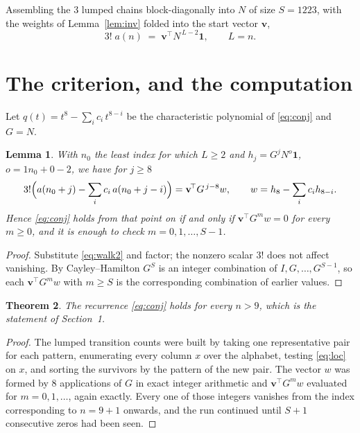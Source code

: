 \documentclass[11pt,a4paper]{article}
\theoremstyle{plain}
\newtheorem{theorem}{Theorem}
\newtheorem{lemma}[theorem]{Lemma}
\theoremstyle{definition}
\begin{document}
Assembling the $3$ lumped chains block-diagonally into $N$ of size $S=1223$, with the
weights of Lemma~\ref{lem:inv} folded into the start vector $\mathbf{v}$,
\begin{equation}\label{eq:walk2}
3!\;a(n)\;=\;\mathbf{v}^{\!\top}N^{\,L-2}\mathbf{1},\qquad L=n .
\end{equation}

\section{The criterion, and the computation}

Let $q(t)=t^{8}-\sum_i c_i\,t^{8-i}$ be the characteristic polynomial of
\eqref{eq:conj} and $G=N$.

\begin{lemma}\label{lem:crit}
With $n_0$ the least index for which $L\ge2$ and $h_j=G^{j}N^{o}\mathbf{1}$,
$o=1n_0+0-2$, we have for $j\ge8$
\[
3!\Bigl(a(n_0+j)-\sum_i c_i\,a(n_0+j-i)\Bigr)
=\mathbf{v}^{\!\top}G^{\,j-8}w,\qquad
w=h_{8}-\sum_i c_i h_{8-i} .
\]
Hence \eqref{eq:conj} holds from that point on if and only if
$\mathbf{v}^{\!\top}G^{m}w=0$ for every $m\ge0$, and it is enough to check
$m=0,1,\dots,S-1$.
\end{lemma}

\begin{proof}
Substitute \eqref{eq:walk2} and factor; the nonzero scalar $3!$ does not affect
vanishing. By Cayley--Hamilton $G^{S}$ is an integer combination of $I,G,\dots,G^{S-1}$,
so each $\mathbf{v}^{\!\top}G^{m}w$ with $m\ge S$ is the corresponding combination of
earlier values.
\end{proof}

\begin{theorem}
The recurrence \eqref{eq:conj} holds for every $n>9$, which is the statement of
Section~1.
\end{theorem}

\begin{proof}
The lumped transition counts were built by taking one representative pair for each pattern,
enumerating every column $x$ over the alphabet, testing \eqref{eq:loc} on $x$, and sorting
the survivors by the pattern of the new pair. The vector $w$ was formed by $8$
applications of $G$ in exact integer arithmetic and $\mathbf{v}^{\!\top}G^{m}w$
evaluated for $m=0,1,\dots$, again exactly. Every one of those integers vanishes from the
index corresponding to $n=9+1$ onwards, and the run continued until $S+1$ consecutive
zeros had been seen.
\end{proof}
\end{document}
